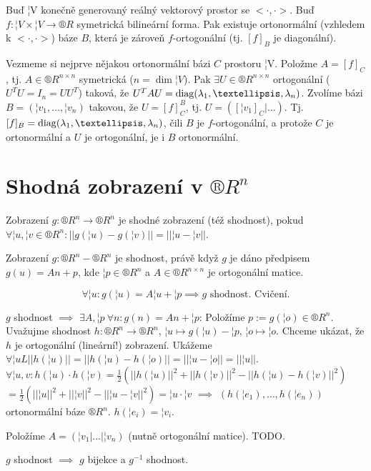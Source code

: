 \documentclass[12pt]{article}                   %
\begin{document}

        \begin{tvrzeni}
            Buď ¦V konečně generovaný reálný vektorový prostor se $<·, ·>$. Buď $f: ¦V \times ¦V \rightarrow ®R$ symetrická bilineární forma. Pak existuje ortonormální (vzhledem k $<·,·>$) báze $B$, která je zároveň $f$-ortogonální (tj. $[f]_B$ je diagonální).

            \begin{dukazin}
                    Vezmeme si nejprve nějakou ortonormální bázi $C$ prostoru ¦V. Položme $A = [f]_C$, tj. $A \in ®R^{n \times n}$ symetrická ($n = \dim ¦V$). Pak $\exists U \in ®R^{n \times n}$ ortogonální ($U^TU = I_n = UU^T$) taková, že $U^TAU = \diag(\lambda_1, …, \lambda_n)$. Zvolíme bázi $B = (¦v_1, …, ¦v_n)$ takovou, že $U = [f]_C^B$, tj. $U = ([¦v_1]_C|…)$. Tj. $[f]_B = \diag(\lambda_1, …, \lambda_n)$, čili $B$ je $f$-ortogonální, a protože $C$ je ortonormální a $U$ je ortogonální, je i $B$ ortonormální.
            \end{dukazin}
        \end{tvrzeni}

\section{Shodná zobrazení v $®R^n$}
    \begin{definice}
        Zobrazení $g: ®R^n \rightarrow ®R^n$ je shodné zobrazení (též shodnost), pokud $\forall ¦u, ¦v \in ®R^n: ||g(¦u) - g(¦v)|| = ||¦u - ¦v||$.
    \end{definice}

    \begin{veta}
        Zobrazení $g: ®R^n - ®R^n$ je shodnost, právě když $g$ je dáno předpisem $g(u) = An + p$, kde $¦p \in ®R^n$ a $A \in ®R^{n \times n}$ je ortogonální matice.

        \begin{dukazin}
            $$ \forall ¦u: g(¦u) = A¦u + ¦p \implies g \text{ shodnost. Cvičení.} $$ 

            $g$ shodnost $\implies$ $\exists A, ¦p\ \forall n: g(n) = An + ¦p$: Položíme $p:= g(¦o) \in ®R^n$. Uvažujme shodnost $h: ®R^n \rightarrow ®R^n$, $¦u \mapsto g(¦u) - ¦p$, $¦o \mapsto ¦o$. Chceme ukázat, že $h$ je ortogonální (lineární!) zobrazení. Ukážeme $\forall ¦uL ||h(¦u)|| = ||h(¦u) - h(¦o)|| = ||¦u - ¦o|| = ||¦u||$. $\forall ¦u, v: h(¦u)·h(¦v) = \frac{1}{2}(||h(¦u)||^2 + ||h(¦v)||^2 - ||h(¦u) - h(¦v)||^2)$ $= \frac{1}{2}(||¦u||^2 + ||¦v||^2 - ||¦u - ¦v||^2) = ¦u·¦v$ $\implies$ $(h(¦e_1), …, h(¦e_n))$ ortonormální báze $®R^n$. $h(¦e_i) = ¦v_i$.

            Položíme $A = (¦v_1|…|¦v_n)$ (nutně ortogonální matice). TODO.
        \end{dukazin}
    \end{veta}

    \begin{dusledek}
        $g$ shodnost $\implies$ $g$ bijekce a $g^{-1}$ shodnost.
    \end{dusledek}
\end{document}
